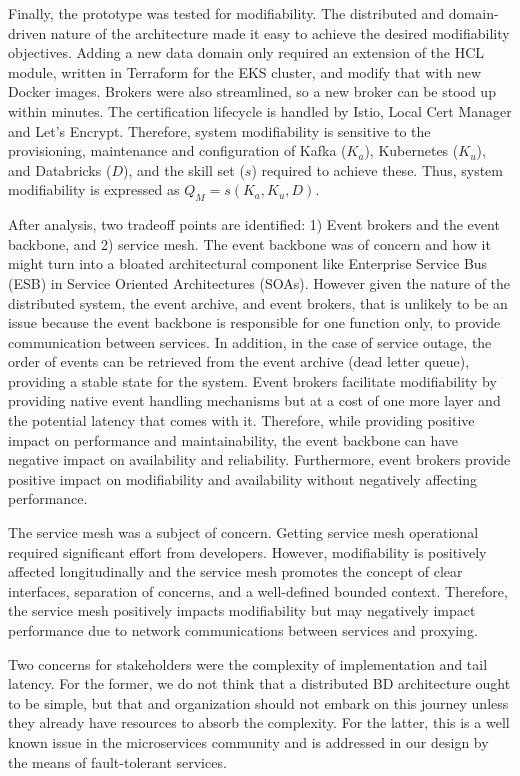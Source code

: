 \documentclass[a4paper,11pt]{article}
\begin{document}
Finally, the prototype was tested for modifiability. The distributed and domain-driven nature of the architecture made it easy to achieve the desired modifiability objectives. Adding a new data domain only required an extension of the HCL module, written in Terraform for the EKS cluster, and modify that with new Docker images. Brokers were also streamlined, so a new broker can be stood up within minutes. The certification lifecycle is handled by Istio, Local Cert Manager and Let's Encrypt. Therefore, system modifiability is sensitive to the provisioning, maintenance and configuration of Kafka ($K_a$), Kubernetes ($K_u$), and Databricks ($D$), and the skill set ($s$) required to achieve these. Thus, system modifiability is expressed as $Q_M = s(K_a, K_u, D)$. 

After analysis, two tradeoff points are identified: 1) Event brokers and the event backbone, and 2) service mesh. The event backbone was of concern and how it might turn into a bloated architectural component like Enterprise Service Bus (ESB) in Service Oriented Architectures (SOAs). However given the nature of the distributed system, the event archive, and event brokers, that is unlikely to be an issue because the event backbone is responsible for one function only, to provide communication between services. In addition, in the case of service outage, the order of events can be retrieved from the event archive (dead letter queue), providing a stable state for the system. Event brokers facilitate modifiability by providing native event handling mechanisms but at a cost of one more layer and the potential latency that comes with it. Therefore, while providing positive impact on performance and maintainability, the event backbone can have negative impact on availability and reliability. Furthermore, event brokers provide positive impact on modifiability and availability without negatively affecting performance. 

The service mesh was a subject of concern. Getting service mesh operational required significant effort from developers. However, modifiability is positively affected longitudinally and the service mesh promotes the concept of clear interfaces, separation of concerns, and a well-defined bounded context. Therefore, the service mesh positively impacts modifiability but may negatively impact performance due to network communications between services and proxying. 
 
Two concerns for stakeholders were the complexity of implementation and tail latency. For the former, we do not think that a distributed BD architecture ought to be simple, but that and organization should not embark on this journey unless they already have resources to absorb the complexity. For the latter, this is a well known issue in the microservices community and is addressed in our design by the means of fault-tolerant services.
\end{document}
